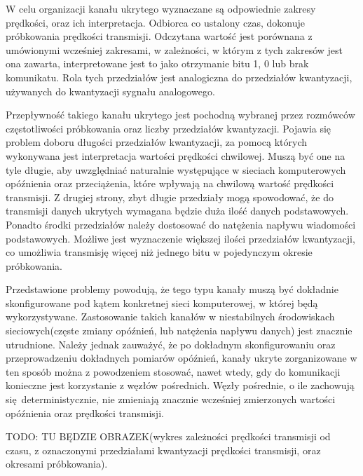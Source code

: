\documentclass[a4paper, twoside]{report}
\begin{document}
        W celu organizacji kanału ukrytego wyznaczane są odpowiednie zakresy prędkości, oraz ich
        interpretacja. Odbiorca co ustalony czas, dokonuje próbkowania prędkości
        transmisji. Odczytana wartość jest porównana z umówionymi wcześniej zakresami,
        w zależności, w którym z tych zakresów jest ona zawarta, interpretowane jest to
        jako otrzymanie bitu 1, 0 lub brak komunikatu. Rola tych przedziałów jest analogiczna
        do przedziałów kwantyzacji, używanych do kwantyzacji sygnału analogowego.

        Przepływność takiego kanału ukrytego jest pochodną wybranej przez rozmówców
        częstotliwości próbkowania oraz liczby przedziałów kwantyzacji. Pojawia się
        problem doboru długości przedziałów kwantyzacji, za pomocą których wykonywana
        jest interpretacja wartości
        prędkości chwilowej. Muszą być one na tyle długie, aby uwzględniać naturalnie
        występujące w sieciach komputerowych opóźnienia oraz przeciążenia, które wpływają
        na chwilową wartość prędkości transmisji. Z drugiej strony, zbyt długie przedziały
        mogą spowodować, że do transmisji danych ukrytych wymagana będzie duża ilość danych
        podstawowych. Ponadto środki przedziałów należy dostosować do natężenia
        napływu wiadomości podstawowych. Możliwe jest wyznaczenie większej ilości
        przedziałów kwantyzacji, co umożliwia transmisję więcej niż jednego bitu w pojedynczym
        okresie próbkowania.

        Przedstawione problemy powodują, że tego typu kanały muszą być dokładnie
        skonfigurowane pod kątem konkretnej sieci komputerowej, w której będą wykorzystywane.
        Zastosowanie takich kanałów w niestabilnych środowiskach sieciowych(częste zmiany
        opóźnień, lub natężenia napływu danych) jest znacznie utrudnione. Należy jednak
        zauważyć, że po dokładnym skonfigurowaniu oraz przeprowadzeniu dokładnych
        pomiarów opóźnień, kanały ukryte zorganizowane w ten sposób można z powodzeniem
        stosować, nawet wtedy, gdy do komunikacji konieczne jest korzystanie z węzłów pośrednich.
        Węzły pośrednie, o ile zachowują się deterministycznie, nie zmieniają znacznie wcześniej
        zmierzonych wartości opóźnienia oraz prędkości transmisji.

        TODO: TU BĘDZIE OBRAZEK(wykres zależności prędkości transmisji od czasu, z
        oznaczonymi przedziałami kwantyzacji prędkości transmisji, oraz okresami
        próbkowania).
\end{document}
